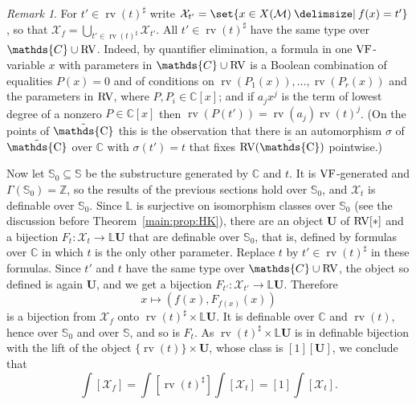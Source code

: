 \documentclass[12pt]{amsart}
\theoremstyle{plain}
\theoremstyle{definition}
\theoremstyle{remark}
\newtheorem{rem}[thm]{Remark}
\numberwithin{equation}{section}
\theoremstyle{plain}
\newcommand{\VF}{\textup{VF}}
\newcommand{\RV}{\textup{RV}}
\newcommand{\MM}{\mdl M}
\newcommand{\Z}{\mathds{Z}}
\newcommand{\C}{\mathds{C}}
\newcommand{\0}{\emptyset}
\newcommand{\mdl}[1]{\mathcal{#1}}  %
\newcommand{\bb}[1]{\mathbb{#1}}
\newcommand{\fun}{\longrightarrow}
\newcommand{\efun}{\longmapsto}
\newcommand{\sub}{\subseteq}
\providecommand\given{}
\newcommand\SetSymbol[1][]{%
\nonscript \: #1 \vert
\allowbreak
\nonscript\:
\mathopen{}}
\renewcommand\given{\SetSymbol[\delimsize]}
\DeclareMathOperator{\rv}{rv}
\DeclareMathOperator{\puC}{\tilde \C}
\begin{document}
\begin{rem}\label{rem-comp-milnor-fib-bis}
For $t' \in \rv(t)^\sharp$ write $\mdl X_{t'} = \set{x \in X(\MM) \given f(x) = t'}$, so that $\mdl X_f = \bigcup_{t'\in \rv(t)^\sharp} \mdl X_{t'}$. All $t' \in \rv(t)^\sharp$ have the same type over $\C \cup \RV$. Indeed, by quantifier elimination, a formula in one $\VF$-variable $x$ with parameters in $\C \cup \RV$ is a Boolean combination of equalities $P(x) = 0$ and of conditions on $\rv(P_1(x)), \ldots, \rv(P_r(x))$ and the parameters in $\RV$, where $P, P_i \in \C[x]$; and if $a_j x^j$ is the term of lowest degree of a nonzero $P \in \C[x]$ then $\rv(P(t')) = \rv(a_j) \rv(t)^j$. (On the points of $\puC$ this is the observation that there is an automorphism $\sigma$ of $\puC$ over $\C$ with $\sigma(t') = t$ that fixes $\RV(\puC)$ pointwise.)

Now let $\mathbb S_0 \sub \mathbb S$ be the substructure generated by $\C$ and $t$. It is $\VF$-generated and $\Gamma(\mathbb S_0) = \Z$, so the results of the previous sections hold over $\mathbb S_0$, and $\mdl X_t$ is definable over $\mathbb S_0$. Since $\bb L$ is surjective on isomorphism classes over $\mathbb S_0$ (see the discussion before Theorem~\ref{main:prop:HK}), there are an object $\bm U$ of $\RV[*]$ and a bijection $F_t : \mdl X_t \fun \bb L \bm U$ that are definable over $\mathbb S_0$, that is, defined by formulas over $\C$ in which $t$ is the only other parameter. Replace $t$ by $t' \in \rv(t)^\sharp$ in these formulas. Since $t'$ and $t$ have the same type over $\C \cup \RV$, the object so defined is again $\bm U$, and we get a bijection $F_{t'} : \mdl X_{t'} \fun \bb L \bm U$. Therefore
\[
x \efun (f(x), F_{f(x)}(x))
\]
is a bijection from $\mdl X_f$ onto $\rv(t)^\sharp \times \bb L \bm U$. It is definable over $\C$ and $\rv(t)$, hence over $\mathbb S_0$ and over $\mathbb S$, and so is $F_t$. As $\rv(t)^\sharp \times \bb L \bm U$ is in definable bijection with the lift of the object $\{\rv(t)\} \times \bm U$, whose class is $[1] [\bm U]$, we conclude that
\begin{equation*}
\int [\mdl X_f] = \int [\rv(t)^\sharp] \int [\mdl X_t] =  [1]\int [\mdl X_t].
\end{equation*}


\end{rem}
\end{document}

